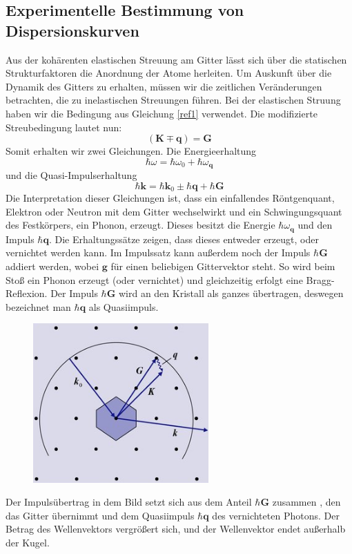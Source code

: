 \documentclass[11pt]{article}
\begin{document}
\subsection{Experimentelle Bestimmung von Dispersionskurven}
Aus der kohärenten elastischen Streuung am Gitter lässt sich über die statischen
Strukturfaktoren die Anordnung der Atome herleiten. Um Auskunft über die Dynamik
des Gitters zu erhalten, müssen wir die zeitlichen Veränderungen betrachten, die
zu inelastischen Streuungen führen. Bei der elastischen Struung haben wir die
Bedingung aus Gleichung \ref{ref1} verwendet. Die modifizierte Streubedingung
lautet nun:
\begin{equation}
  (\bm{K} \mp \bm{q}) = \bm{G}
\end{equation}
Somit erhalten wir zwei Gleichungen. Die Energieerhaltung
\begin{equation}
  \hbar\omega=\hbar\omega_0+\hbar\omega_{\bm{q}}
\end{equation}
und die Quasi-Impulserhaltung
\begin{equation}
  \hbar\bm{k}=\hbar\bm{k}_0\pm\hbar\bm{q}+\hbar\bm{G}
\end{equation}
Die Interpretation dieser Gleichungen ist, dass ein einfallendes Röntgenquant,
Elektron oder Neutron mit dem Gitter wechselwirkt und ein Schwingungsquant des
Festkörpers, ein Phonon, erzeugt. Dieses besitzt die Energie $\hbar\omega_{
\bm{q}}$ und den Impuls $\hbar\bm{q}$. Die Erhaltungssätze zeigen, dass dieses
entweder erzeugt, oder vernichtet werden kann. Im Impulssatz kann außerdem noch
der Impuls $\hbar\bm{G}$ addiert werden, wobei $\bm{g}$ für einen beliebigen
Gittervektor steht. So wird beim Stoß ein Phonon erzeugt (oder vernichtet) und
gleichzeitig erfolgt eine Bragg-Reflexion. Der Impuls $\hbar\bm{G}$ wird an den
Kristall als ganzes übertragen, deswegen bezeichnet man $\hbar\bm{q}$ als
Quasiimpuls.
\begin{figure}[h]
\includegraphics[width=0.6\textwidth]{ewald-kugel}
\centering
\label{fig:ewald-kugel}
\end{figure}
Der Impulsübertrag in dem Bild setzt sich aus dem Anteil $\hbar\bm{G}$ zusammen
, den das Gitter übernimmt und dem Quasiimpuls $\hbar\bm{q}$ des vernichteten
Photons. Der Betrag des Wellenvektors vergrößert sich, und der Wellenvektor
endet außerhalb der Kugel.
\end{document}
